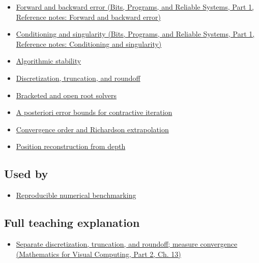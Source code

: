 \begin{itemize}
\tightlist
\item
  \href{../01-Bits-Programs-and-Reliable-Systems-P01/main.pdf\#appendix-a7fbaf6d1b1c}{Forward and backward error (Bits, Programs, and Reliable Systems, Part 1, Reference notes: Forward and backward error)}
\item
  \href{../01-Bits-Programs-and-Reliable-Systems-P01/main.pdf\#appendix-8f6a01f284a7}{Conditioning and singularity (Bits, Programs, and Reliable Systems, Part 1, Reference notes: Conditioning and singularity)}
\item
  \hyperref[appendix-aa2bf0d79639]{Algorithmic stability}
\item
  \hyperref[appendix-6b0648b2b8e8]{Discretization, truncation, and roundoff}
\item
  \hyperref[appendix-f63eb850796d]{Bracketed and open root solvers}
\item
  \hyperref[appendix-d83b0ad1be7f]{A posteriori error bounds for contractive iteration}
\item
  \hyperref[appendix-aca80b6bf17a]{Convergence order and Richardson extrapolation}
\item
  \hyperref[appendix-2cbf2968e866]{Position reconstruction from depth}
\end{itemize}

\subsection{Used by}\label{appendix-31b8c295e05f-used-by}

\hypertarget{appendix-31b8c295e05f-used-by}{}

\begin{itemize}
\tightlist
\item
  \hyperref[appendix-b9db93e28371]{Reproducible numerical benchmarking}
\end{itemize}

\subsection{Full teaching explanation}\label{appendix-31b8c295e05f-full-teaching-explanation}

\hypertarget{appendix-31b8c295e05f-full-teaching-explanation}{}

\begin{itemize}
\tightlist
\item
  \href{../02-Mathematics-for-Visual-Computing-P02/main.pdf\#02-foundations-ii-ch029-separate-discretization-truncation-and-roundoff-measure-convergence}{Separate discretization, truncation, and roundoff; measure convergence (Mathematics for Visual Computing, Part 2, Ch. 13)}
\end{itemize}

